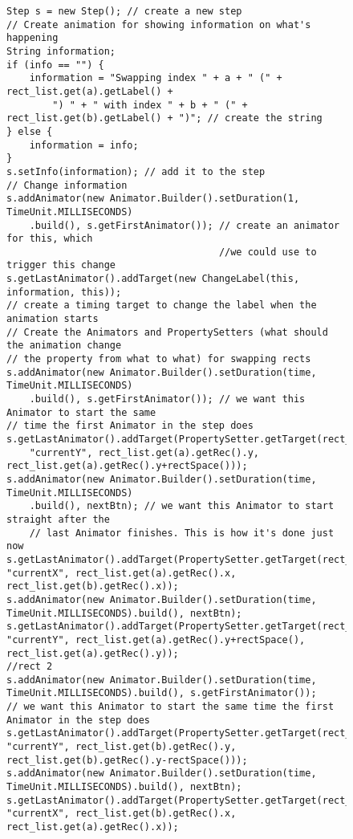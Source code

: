 \begin{figure}
\begin{center}
\begin{verbatim}
Step s = new Step(); // create a new step
// Create animation for showing information on what's happening
String information;
if (info == "") {
    information = "Swapping index " + a + " (" + rect_list.get(a).getLabel() + 
        ") " + " with index " + b + " (" + rect_list.get(b).getLabel() + ")"; // create the string
} else {
    information = info;
}
s.setInfo(information); // add it to the step
// Change information
s.addAnimator(new Animator.Builder().setDuration(1, TimeUnit.MILLISECONDS)
    .build(), s.getFirstAnimator()); // create an animator for this, which 
                                     //we could use to trigger this change
s.getLastAnimator().addTarget(new ChangeLabel(this, information, this));
// create a timing target to change the label when the animation starts	
// Create the Animators and PropertySetters (what should the animation change 
// the property from what to what) for swapping rects
s.addAnimator(new Animator.Builder().setDuration(time, TimeUnit.MILLISECONDS)
	.build(), s.getFirstAnimator()); // we want this Animator to start the same
// time the first Animator in the step does
s.getLastAnimator().addTarget(PropertySetter.getTarget(rect_list.get(a), 
	"currentY", rect_list.get(a).getRec().y, rect_list.get(a).getRec().y+rectSpace()));
s.addAnimator(new Animator.Builder().setDuration(time, TimeUnit.MILLISECONDS)
	.build(), nextBtn); // we want this Animator to start straight after the 
	// last Animator finishes. This is how it's done just now
s.getLastAnimator().addTarget(PropertySetter.getTarget(rect_list.get(a), "currentX", rect_list.get(a).getRec().x, rect_list.get(b).getRec().x)); 
s.addAnimator(new Animator.Builder().setDuration(time, TimeUnit.MILLISECONDS).build(), nextBtn);
s.getLastAnimator().addTarget(PropertySetter.getTarget(rect_list.get(a), "currentY", rect_list.get(a).getRec().y+rectSpace(), rect_list.get(a).getRec().y));		
//rect 2
s.addAnimator(new Animator.Builder().setDuration(time, TimeUnit.MILLISECONDS).build(), s.getFirstAnimator());															// we want this Animator to start the same time the first Animator in the step does
s.getLastAnimator().addTarget(PropertySetter.getTarget(rect_list.get(b), "currentY", rect_list.get(b).getRec().y, rect_list.get(b).getRec().y-rectSpace()));
s.addAnimator(new Animator.Builder().setDuration(time, TimeUnit.MILLISECONDS).build(), nextBtn);
s.getLastAnimator().addTarget(PropertySetter.getTarget(rect_list.get(b), "currentX", rect_list.get(b).getRec().x, rect_list.get(a).getRec().x));

\end{verbatim}
\end{center}
\end{figure}
